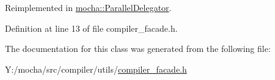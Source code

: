 Reimplemented in \hyperlink{classmocha_1_1_parallel_delegator_a7cc8e03175669290ddb4b39ee5e1c1d6}{mocha::ParallelDelegator}.



Definition at line 13 of file compiler\_\-facade.h.



The documentation for this class was generated from the following file:\begin{DoxyCompactItemize}
\item 
Y:/mocha/src/compiler/utils/\hyperlink{compiler__facade_8h}{compiler\_\-facade.h}\end{DoxyCompactItemize}
